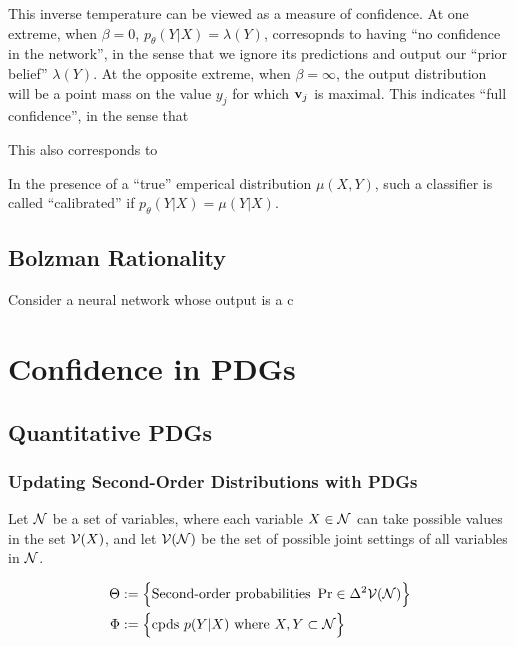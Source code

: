 \documentclass{article}
\begin{document}
This inverse temperature can be viewed as a measure of confidence. 
At one extreme, when $\beta = 0$, $p_\theta(Y|X) = \lambda(Y)$, corresopnds to having ``no confidence in the network'', in the sense that we ignore its predictions and output our ``prior belief'' $\lambda(Y)$. 
At the opposite extreme, when $\beta = \infty$, the output distribution will be a point mass on the value $y_j$ for which $\mathbf{v}_j$ is maximal.
This indicates ``full confidence'', in the sense that 

This also corresponds to 

In the presence of a ``true'' emperical distribution $\mu(X,Y)$, such a classifier is called ``calibrated'' if $p_\theta(Y|X) = \mu(Y|X)$. 

\subsection{Bolzman Rationality}

\begin{examplex}{}{}
	Consider a neural network whose output is a c
\end{examplex}

\section{Confidence in PDGs}
\subsection{Quantitative PDGs}

\subsubsection{Updating Second-Order Distributions with PDGs}
Let $\mathcal N$ be a set of variables, where each variable $X \in \mathcal N$ can take possible values in the set $\mathcal V(X)$, and let $\mathcal V(\mathcal N)$ be the set of possible joint settings of all variables in $\mathcal N$.

\begin{align*}
	\Theta &:=
		\Big\{
		\text{Second-order probabilities}~ \Pr \in \Delta^2 \mathcal V(\mathcal N)
		\Big\} \\
	\Phi &:= \Big\{ \text{cpds}~ p(Y|X)
		\text{ where }  X, Y \subset \mathcal N \Big\}
\end{align*}
\end{document}
